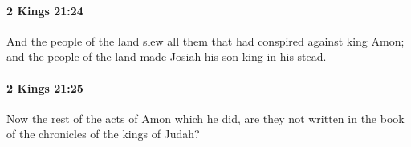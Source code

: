		\paragraph{2 Kings 21:24} %
			\label{2KINGS-21-24}

			And the people of the land slew all them that had conspired against king Amon; and the people of the land made Josiah his son king in his stead.


		\paragraph{2 Kings 21:25} %
			\label{2KINGS-21-25}

			Now the rest of the acts of Amon which he did, are they not written in the book of the chronicles of the kings of Judah?


